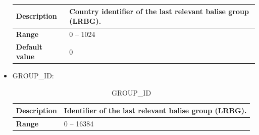 \documentclass{template/openetcs}
\begin{document}
\begin{itemize}
\begin{longtable}{|l|l|}
					\begin{minipage}[t]{0.22\linewidth} \textbf{Description} \end{minipage} 
				&	\begin{minipage}[t]{0.78\linewidth} Country identifier of the last relevant balise group (LRBG). \end{minipage} \\
				
				\hline
																																									
					\begin{minipage}[t]{0.22\linewidth} \textbf{Range} \end{minipage} 
				&	\begin{minipage}[t]{0.78\linewidth} 0 – 1024 \end{minipage} \\
				
				\hline
				
					\begin{minipage}[t]{0.22\linewidth} \textbf{Default value} \end{minipage} 
				&	\begin{minipage}[t]{0.78\linewidth} 0 \end{minipage} \\
				
				\hline
				
			\end{longtable}
			
		\item GROUP\_ID:
												
			\begin{longtable}{|l|l|}
				\caption{GROUP\_ID}\\ 
				\hline
				
					\begin{minipage}[t]{0.22\linewidth} \textbf{Description} \end{minipage} 
				&	\begin{minipage}[t]{0.78\linewidth} Identifier of the last relevant balise group (LRBG). \end{minipage} \\
				
				\hline
																																									
					\begin{minipage}[t]{0.22\linewidth} \textbf{Range} \end{minipage} 
				&	\begin{minipage}[t]{0.78\linewidth} 0 – 16384 \end{minipage} \\
				

\end{longtable}
\end{itemize}
\end{document}
